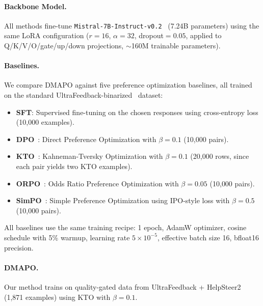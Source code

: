 \documentclass[10pt,twocolumn]{article}
\newcommand{\ours}{\textsc{DMAPO}}
\begin{document}
\paragraph{Backbone Model.}
All methods fine-tune \texttt{Mistral-7B-Instruct-v0.2}~\cite{jiang2023mistral} (7.24B parameters) using the same LoRA configuration ($r{=}16$, $\alpha{=}32$, dropout${=}0.05$, applied to Q/K/V/O/gate/up/down projections, $\sim$160M trainable parameters).

\paragraph{Baselines.}
We compare \ours{} against five preference optimization baselines, all trained on the standard UltraFeedback-binarized~\cite{cui2023ultrafeedback} dataset:
\begin{itemize}[leftmargin=*,itemsep=1pt,topsep=2pt]
  \item \textbf{SFT}: Supervised fine-tuning on the chosen responses using cross-entropy loss (10{,}000 examples).
  \item \textbf{DPO}~\cite{rafailov2023dpo}: Direct Preference Optimization with $\beta{=}0.1$ (10{,}000 pairs).
  \item \textbf{KTO}~\cite{ethayarajh2024kto}: Kahneman-Tversky Optimization with $\beta{=}0.1$ (20{,}000 rows, since each pair yields two KTO examples).
  \item \textbf{ORPO}~\cite{hong2024orpo}: Odds Ratio Preference Optimization with $\beta{=}0.05$ (10{,}000 pairs).
  \item \textbf{SimPO}~\cite{meng2024simpo}: Simple Preference Optimization using IPO-style loss with $\beta{=}0.5$ (10{,}000 pairs).
\end{itemize}
All baselines use the same training recipe: 1 epoch, AdamW optimizer, cosine schedule with 5\% warmup, learning rate $5 \times 10^{-5}$, effective batch size 16, bfloat16 precision.

\paragraph{DMAPO.}
Our method trains on quality-gated data from UltraFeedback + HelpSteer2 (1{,}871 examples) using KTO with $\beta{=}0.1$.
\end{document}
